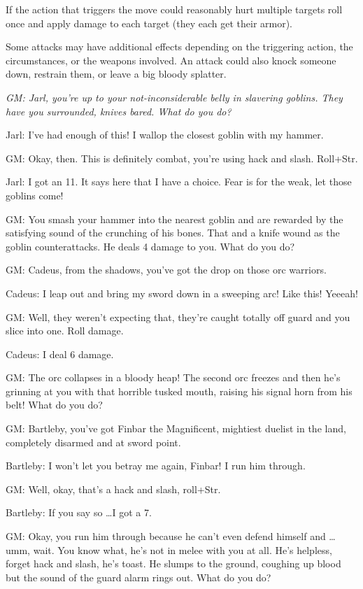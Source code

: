  If the action that triggers the move could reasonably hurt multiple targets roll once and apply damage to each target (they each get their armor).


 Some attacks may have additional effects depending on the triggering action, the circumstances, or the weapons involved. An attack could also knock someone down, restrain them, or leave a big bloody splatter.

{\itshape
 GM: Jarl, you're up to your not-inconsiderable belly in slavering goblins. They have you surrounded, knives bared. What do you do?


 Jarl: I've had enough of this! I wallop the closest goblin with my hammer.


 GM: Okay, then. This is definitely combat, you're using hack and slash. Roll+Str.


 Jarl: I got an 11. It says here that I have a choice. Fear is for the weak, let those goblins come!


 GM: You smash your hammer into the nearest goblin and are rewarded by the satisfying sound of the crunching of his bones. That and a knife wound as the goblin counterattacks. He deals 4 damage to you. What do you do?


 GM: Cadeus, from the shadows, you've got the drop on those orc warriors.


 Cadeus: I leap out and bring my sword down in a sweeping arc! Like this! Yeeeah!


 GM: Well, they weren't expecting that, they're caught totally off guard and you slice into one. Roll damage.


 Cadeus: I deal 6 damage.


 GM: The orc collapses in a bloody heap! The second orc freezes and then he's grinning at you with that horrible tusked mouth, raising his signal horn from his belt! What do you do?


 GM: Bartleby, you've got Finbar the Magnificent, mightiest duelist in the land, completely disarmed and at sword point.


 Bartleby: I won't let you betray me again, Finbar! I run him through.


 GM: Well, okay, that's a hack and slash, roll+Str.


 Bartleby: If you say so \ldots  I got a 7.


 GM: Okay, you run him through because he can't even defend himself and \ldots  umm, wait. You know what, he's not in melee with you at all. He's helpless, forget hack and slash, he's toast. He slumps to the ground, coughing up blood but the sound of the guard alarm rings out. What do you do?
}
